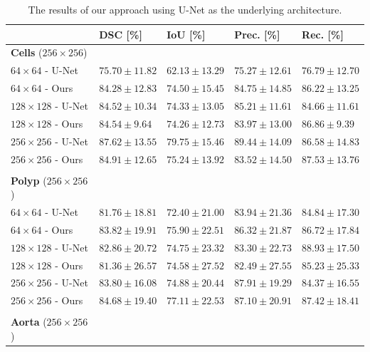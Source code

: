 \begin{table}[t!]
\caption{The results of our approach using U-Net as the underlying architecture.\label{tab:seg-then-seg-results}}
		\begin{tabularx}{\textwidth}{lCCCC}
			& \textbf{DSC [\%]} & \textbf{IoU [\%]} & \textbf{Prec. [\%]} & \textbf{Rec. [\%]}\\
			\toprule
\toprule
\textbf{Cells} ($256 \times 256$) & & & & \\
\midrule
$64 \times 64$ - U-Net & $75.70 \pm 11.82$ & $62.13 \pm 13.29$ & $75.27 \pm 12.61$ & $76.79 \pm 12.70$ \\
$64 \times 64$ - Ours & $84.28 \pm 12.83$ & $74.50 \pm 15.45$ & $84.75 \pm 14.85$ & $86.22 \pm 13.25$ \\
\midrule
$128 \times 128$ - U-Net & $84.52 \pm 10.34$ & $74.33 \pm 13.05$ & $85.21 \pm 11.61$ & $84.66 \pm 11.61$ \\
$128 \times 128$ - Ours & $84.54 \pm 9.64$ & $74.26 \pm 12.73$ & $83.97 \pm 13.00$ & $86.86 \pm 9.39$ \\
\midrule
$256 \times 256$ - U-Net & $87.62 \pm 13.55$ & $79.75 \pm 15.46$ & $89.44 \pm 14.09$ & $86.58 \pm 14.83$ \\
$256 \times 256$ - Ours & $84.91 \pm 12.65$ & $75.24 \pm 13.92$ & $83.52 \pm 14.50$ & $87.53 \pm 13.76$ \\
\bottomrule \\
\toprule
\textbf{Polyp} ($256 \times 256$) & & & & \\
\midrule
$64 \times 64$ - U-Net & $81.76 \pm 18.81$ & $72.40 \pm 21.00$ & $83.94 \pm 21.36$ & $84.84 \pm 17.30$ \\
$64 \times 64$ - Ours & $83.82 \pm 19.91$ & $75.90 \pm 22.51$ & $86.32 \pm 21.87$ & $86.72 \pm 17.84$ \\
\midrule
$128 \times 128$ - U-Net & $82.86 \pm 20.72$ & $74.75 \pm 23.32$ & $83.30 \pm 22.73$ & $88.93 \pm 17.50$ \\
$128 \times 128$ - Ours & $81.36 \pm 26.57$ & $74.58 \pm 27.52$ & $82.49 \pm 27.55$ & $85.23 \pm 25.33$ \\
\midrule
$256 \times 256$ - U-Net & $83.80 \pm 16.08$ & $74.88 \pm 20.44$ & $87.91 \pm 19.29$ & $84.37 \pm 16.55$ \\
$256 \times 256$ - Ours & $84.68 \pm 19.40$ & $77.11 \pm 22.53$ & $87.10 \pm 20.91$ & $87.42 \pm 18.41$ \\
\bottomrule \\
\toprule
\textbf{Aorta} ($256 \times 256$) & & & & \\

\end{tabularx}
\end{table}
